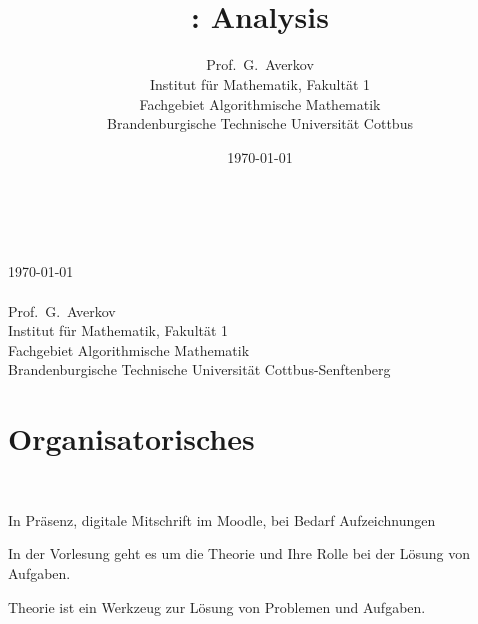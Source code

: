 

\author{Prof.~G.~Averkov\\{\small Institut für Mathematik, Fakultät 1}\\{\small Fachgebiet Algorithmische Mathematik}\\{\small Brandenburgische Technische Universität Cottbus}}
\title{\Huge{}\\ \Large{: Analysis}}
\date{\today}

\mainmatter
\thispagestyle{empty}
\begin{center}
	\Huge{}\\ \Large{}
	\\ \normalsize{\today}
	\\ {\ }
	\\ \large{Prof.~G.~Averkov} 
	\\{\small Institut für Mathematik, Fakultät 1}\\{\small Fachgebiet Algorithmische Mathematik}\\{\small Brandenburgische Technische Universität Cottbus-Senftenberg}
\end{center} 

\tableofcontents

\chapter*{Organisatorisches} 

\begin{bem}[Vorlesung] {\ } 
	\begin{enuma} 
		\item In Präsenz, digitale Mitschrift im Moodle, bei Bedarf Aufzeichnungen 
		\item In der Vorlesung geht es um die Theorie und Ihre Rolle bei der Lösung von Aufgaben. 
		\item  Theorie ist ein Werkzeug zur Lösung von Problemen und Aufgaben.
	\end{enuma}
\end{bem} 


